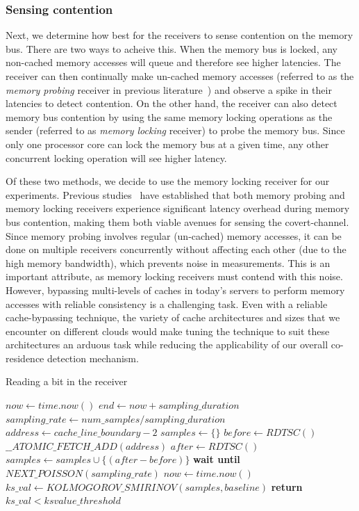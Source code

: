\subsubsection{Sensing contention} 
Next, we determine how best for the receivers to sense contention on the memory
bus. There are two ways to acheive this. When the memory bus is locked, any
non-cached memory accesses will queue and therefore see higher latencies.  The
receiver can then continually make un-cached memory accesses (referred to as the
\textit{memory probing} receiver in previous literature~\cite{varadarajan2015})
and observe a spike in their latencies to detect contention. On the other hand,
the receiver can also detect memory bus contention by using the same memory
locking operations as the sender (referred to as \textit{memory locking}
receiver) to probe the memory bus. Since only one processor core can lock the
memory bus at a given time, any other concurrent locking operation will see
higher latency. 

Of these two methods, we decide to use the memory locking receiver for our
experiments.  Previous studies~\cite{wuusenix2012,varadarajan2015} have
established that both memory probing and memory locking receivers experience
significant latency overhead during memory bus contention, making them both
viable avenues for sensing the covert-channel. 
Since memory probing involves regular (un-cached) memory accesses, it can be done
on multiple receivers concurrently without affecting each other (due to the high
memory bandwidth), which prevents noise in measurements. This is an important
attribute, as memory locking receivers must contend with this noise. However,
bypassing multi-levels of caches in today's servers to perform memory accesses
with reliable consistency is a challenging task. Even with a reliable
cache-bypassing technique, the variety of cache architectures and sizes that we
encounter on different clouds would make tuning the technique to suit these
architectures an arduous task while reducing the applicability of our overall
co-residence detection mechanism. 


\begin{algorithm}[!t]
\caption{Reading a bit in the receiver}
\label{alg:receiver}
\begin{algorithmic}[1]
\STATE $now \leftarrow  time.now()$
\STATE $end \leftarrow now + sampling\_duration$
\STATE $sampling\_rate \leftarrow num\_samples / sampling\_duration$
\STATE $address \leftarrow cache\_line\_boundary-2$
\STATE $samples \leftarrow \{\} $
    \STATE $before \leftarrow RDTSC()$
    \STATE $\_\_ATOMIC\_FETCH\_ADD(address)$
    \STATE $after \leftarrow RDTSC()$
    \STATE $samples \leftarrow samples \cup \{(after-before)\}$
    \STATE \textbf{wait until} $NEXT\_POISSON(sampling\_rate)$
    \STATE $now \leftarrow  time.now()$
\ENDWHILE
\STATE $ks\_val \leftarrow KOLMOGOROV\_SMIRINOV(samples, baseline)$
\STATE \textbf{return} $ks\_val < ksvalue\_threshold$
\end{algorithmic}
\end{algorithm}


